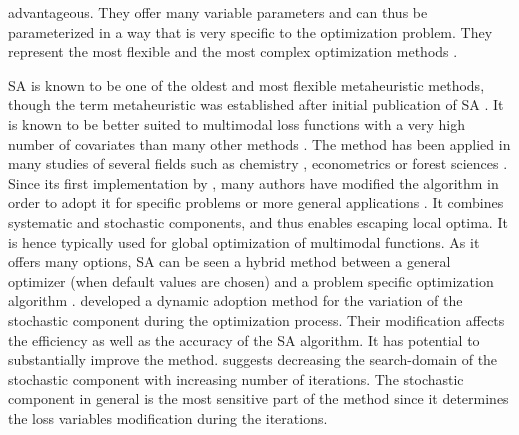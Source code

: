 advantageous. They offer many variable parameters and can thus be parameterized in a way that is very specific to the optimization problem. They represent the most flexible and the most complex optimization methods \citep{blum_2003}.

SA \citep{kirkpatrick_1983} is known to be one of the oldest and most flexible metaheuristic methods, though the term metaheuristic was established after initial publication of SA \citep{blum_2003}. It is known to be better suited to multimodal loss functions with a very high number of covariates than many other methods \citep{corana_1987}. The method has been applied in many studies of several fields such as chemistry \citep{agostini_2006}, econometrics \citep{ingber_1993} or forest sciences \citep{baskent_2002, boston_1999}. Since its first implementation by \citet{kirkpatrick_1983}, many authors have modified the algorithm in order to adopt it for specific problems \citep[e.g.][]{desarbo_1989, goffe_1996} or more general applications \citep[e.g.][]{xiang_2013}. It combines systematic and stochastic components, and thus enables escaping local optima. It is hence typically used for global optimization of multimodal functions. As it offers many options, SA can be seen a hybrid method between a general optimizer (when default values are chosen) and a problem specific optimization algorithm \citep{wegener_2005}. \citet{corana_1987} developed a dynamic adoption method for the variation of the stochastic component during the optimization process. Their modification affects the efficiency as well as the accuracy of the SA algorithm. It has potential to substantially improve the method. \citet{pronzato_1984} suggests decreasing the search-domain of the stochastic component with increasing number of iterations. The stochastic component in general is the most sensitive part of the method since it determines the loss variables modification during the iterations.

